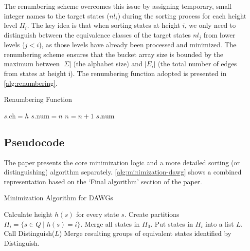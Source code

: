 The renumbering scheme overcomes this issue by assigning temporary, small integer names to the target states ($nl_i$) during the sorting process for each height level $\Pi_i$. The key idea is that when sorting states at height $i$, we only need to distinguish between the equivalence classes of the target states $nl_j$ from lower levels ($j < i$), as those levels have already been processed and minimized. The renumbering scheme ensures that the bucket array size is bounded by the maximum between $|\Sigma|$ (the alphabet size) and $|E_i|$ (the total number of edges from states at height i). The renumbering function adopted is presented in \cref{alg:renumbering}.

\begin{algorithm}[H]
    \caption{Renumbering Function}
    \label{alg:renumbering}
    \begin{algorithmic}[1]
                \State $s.\text{ch} = h$
                \State $s.\text{num} = n$
                \State $n = n + 1$
            \EndIf
            \State \Return $s.\text{num}$
        \EndFunction
    \end{algorithmic}
\end{algorithm}

\subsection{Pseudocode}
The paper presents \cite{revuz1992minimisation} the core minimization logic and a more detailed sorting (or distinguishing) algorithm separately. \cref{alg:minimization-dawg} shows a combined representation based on the `Final algorithm' section of the paper.

\begin{algorithm}[H]
    \caption{Minimization Algorithm for DAWGs}
    \label{alg:minimization-dawg}
    \begin{algorithmic}[1]
    \State Calculate height $h(s)$ for every state $s$.
    \State Create partitions $\Pi_i = \{s \in Q \mid h(s) = i\}$.
    \State Merge all states in $\Pi_0$.
     
        \State {}
        \State Put states in $\Pi_i$ into a list $L$. 
        \State Call Distinguish($L$)
        \State Merge resulting groups of equivalent states identified by Distinguish.
    \EndFor
    \end{algorithmic}
\end{algorithm}

